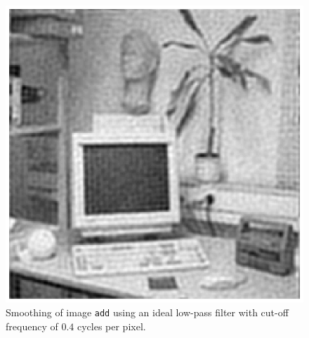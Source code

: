 \begin{minipage}{\linewidth}
\begin{minipage}{0.4\linewidth}
\begin{figure}[H]
      \includegraphics[scale=0.5]{./images/Q17/ideal/add_02.eps}
      \caption{Smoothing of image \texttt{add} using an ideal low-pass filter with cut-off frequency of $0.4$ cycles per pixel.}
      \label{fig:Q17_ideal_add_02}
    \end{figure}
  \end{minipage}
\end{minipage}
\\

